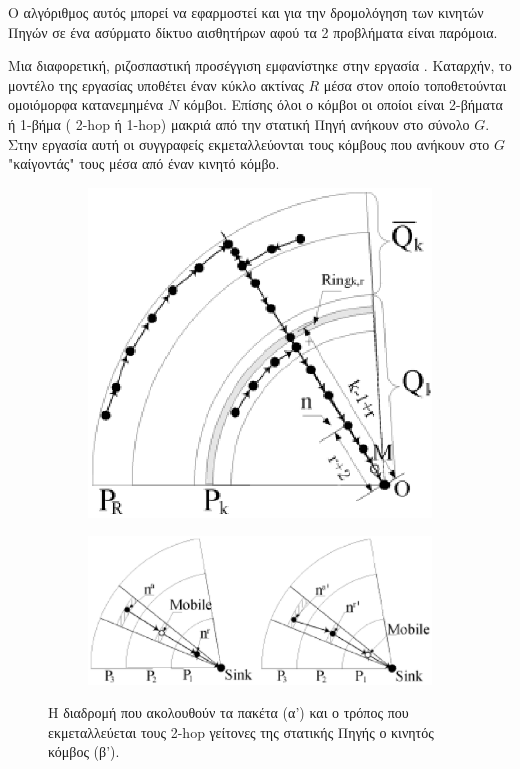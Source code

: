  Ο αλγόριθμος αυτός μπορεί να εφαρμοστεί και για την δρομολόγηση των κινητών Πηγών σε ένα ασύρματο δίκτυο αισθητήρων αφού τα 2 προβλήματα είναι παρόμοια.

Μια διαφορετική, ριζοσπαστική προσέγγιση εμφανίστηκε στην εργασία \cite{extending_lifetime_rizo}. Καταρχήν, το μοντέλο της εργασίας υποθέτει έναν κύκλο ακτίνας $R$
μέσα στον οποίο τοποθετούνται ομοιόμορφα κατανεμημένα $N$ κόμβοι. Επίσης όλοι ο κόμβοι οι οποίοι είναι 2-βήματα ή 1-βήμα ( 2-hop ή 1-hop) μακριά από την στατική Πηγή
ανήκουν στο σύνολο $G$. Στην εργασία αυτή οι συγγραφείς εκμεταλλεύονται τους κόμβους που ανήκουν στο $G$ "καίγοντάς" τους μέσα από έναν κινητό κόμβο.
\begin{figure}[h]
\begin{subfigure}{0.4\textwidth}
\centering
\includegraphics[scale=0.4]{images/extending_lifetime_1.eps}
\caption{}
\label{fig:extending_lifetime_path}
\end{subfigure}
\begin{subfigure}{0.5\textwidth}
\centering
\includegraphics[scale=0.5]{images/extending_lifetime_2.eps}
\caption{}
\label{fig:extending_lifetime_depletion}
\end{subfigure}
\caption{Η διαδρομή που ακολουθούν τα πακέτα (α') και ο τρόπος που εκμεταλλεύεται τους 2-hop γείτονες της στατικής Πηγής ο κινητός κόμβος (β'). }
\label{fig:}
\end{figure}
